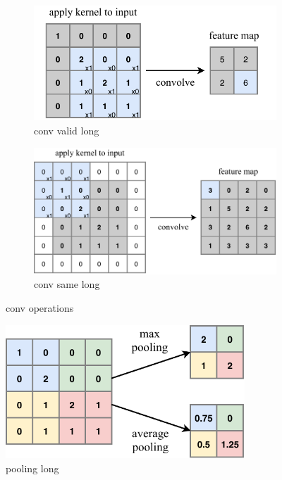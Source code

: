 \begin{figure} %
    \centering
    \begin{subfigure}[b]{0.71\textwidth}
        \centering
        \includegraphics[width=\textwidth]{diagrams/7-cvn/conv_valid.pdf}
        \caption{conv valid long}
        \label{fig:conv_valid}
    \end{subfigure}
    \hfill
    \begin{subfigure}[b]{0.9\textwidth}
        \centering
        \includegraphics[width=\textwidth]{diagrams/7-cvn/conv_same.pdf}
        \caption{conv same long}
        \label{fig:conv_same}
    \end{subfigure}
    \caption{conv operations}
    \label{fig:conv_operations}
\end{figure}

\begin{figure} %
    \includegraphics[width=0.8\textwidth]{diagrams/7-cvn/pooling.pdf}
    \caption[pooling short]
    {pooling long}
    \label{fig:pooling}
\end{figure}

